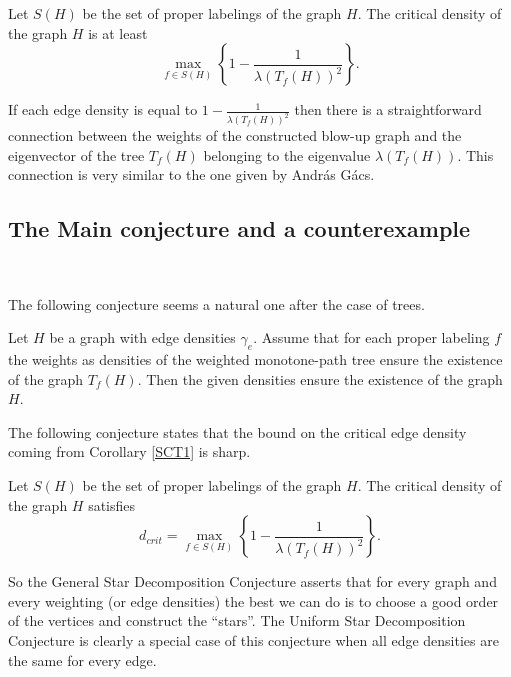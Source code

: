 \documentclass[12pt,a4paper]{amsart}
\numberwithin{equation}{section}
\begin{document}
\begin{cor} \label{SCT1} Let $S(H)$ be the set of proper labelings of the
  graph $H$. The critical density of the graph $H$ is at least  
$$\max_{f\in S(H)}\left\{1-\frac{1}{\lambda(T_f(H))^2}\right\}.$$ 
\end{cor}

\begin{remark} If each edge density is equal to
  $1-\frac{1}{\lambda(T_f(H))^2}$ then there is a straightforward connection
  between the weights of the constructed blow-up graph and the eigenvector of
  the tree $T_f(H)$ belonging to the eigenvalue $\lambda(T_f(H))$. This
  connection is very similar to the one given by Andr\'as G\'acs.
\end{remark}

\subsection{The Main conjecture and  a counterexample}\ \ 
\bigskip

The following conjecture seems a natural one after the case of trees. 

\begin{conj} \label{SC1} Let $H$ be  a
  graph with edge densities 
  $\gamma_e$. Assume that for each proper labeling $f$ the weights 
 as densities  of the weighted monotone-path tree ensure the existence of the
 graph $T_f(H)$. Then the given densities ensure the existence of the graph $H$.
\end{conj}

The following conjecture states that the bound on the critical edge density
coming from Corollary \ref{SCT1} is sharp.

\begin{conj} \label{SC2}
 Let $S(H)$ be the set of proper labelings of the
  graph $H$.  The critical density of the graph $H$ satisfies 
$$d_{crit}=\max_{f\in S(H)}\left\{1-\frac{1}{\lambda(T_f(H))^2}\right\}.$$ 
\end{conj}

\begin{remark} So the General Star Decomposition Conjecture asserts that for
  every graph and every weighting (or edge densities) the best we can do is to
  choose a good order of the vertices and construct the ``stars''. The Uniform
  Star Decomposition Conjecture is clearly a special case of this conjecture
  when all edge densities are the same for every edge. 
\end{remark}
\end{document}
